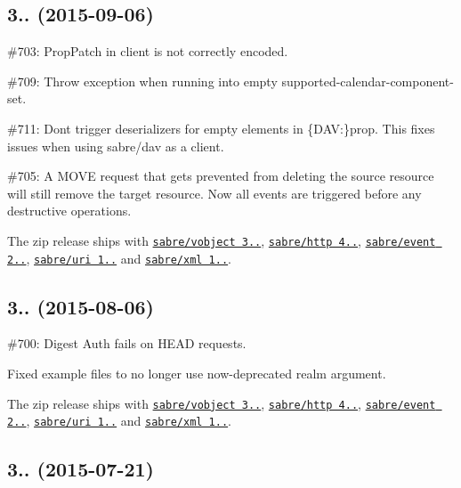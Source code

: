 \subsection*{3.. (2015-\/09-\/06) }


\begin{DoxyItemize}
\item \#703\+: Prop\+Patch in client is not correctly encoded.
\item \#709\+: Throw exception when running into empty {\ttfamily supported-\/calendar-\/component-\/set}.
\item \#711\+: Don\textquotesingle{}t trigger deserializers for empty elements in {\ttfamily \{D\+AV\+:\}prop}. This fixes issues when using sabre/dav as a client.
\item \#705\+: A {\ttfamily M\+O\+VE} request that gets prevented from deleting the source resource will still remove the target resource. Now all events are triggered before any destructive operations.
\item The zip release ships with \href{http://sabre.io/vobject/}{\tt sabre/vobject 3..}, \href{http://sabre.io/http/}{\tt sabre/http 4..}, \href{http://sabre.io/event/}{\tt sabre/event 2..}, \href{http://sabre.io/uri/}{\tt sabre/uri 1..} and \href{http://sabre.io/xml/}{\tt sabre/xml 1..}.
\end{DoxyItemize}

\subsection*{3.. (2015-\/08-\/06) }


\begin{DoxyItemize}
\item \#700\+: Digest Auth fails on {\ttfamily H\+E\+AD} requests.
\item Fixed example files to no longer use now-\/deprecated realm argument.
\item The zip release ships with \href{http://sabre.io/vobject/}{\tt sabre/vobject 3..}, \href{http://sabre.io/http/}{\tt sabre/http 4..}, \href{http://sabre.io/event/}{\tt sabre/event 2..}, \href{http://sabre.io/uri/}{\tt sabre/uri 1..} and \href{http://sabre.io/xml/}{\tt sabre/xml 1..}.
\end{DoxyItemize}

\subsection*{3.. (2015-\/07-\/21) }


